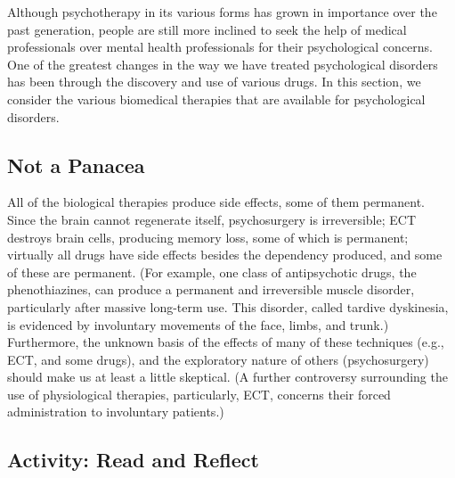 \documentclass[
]{book}
\begin{document}
Although psychotherapy in its various forms has grown in importance over the past generation, people are still more inclined to seek the help of medical professionals over mental health professionals for their psychological concerns. One of the greatest changes in the way we have treated psychological disorders has been through the discovery and use of various drugs. In this section, we consider the various biomedical therapies that are available for psychological disorders.

\hypertarget{not-a-panacea}{%
\subsection*{Not a Panacea}\label{not-a-panacea}}

All of the biological therapies produce side effects, some of them permanent. Since the brain cannot regenerate itself, psychosurgery is irreversible; ECT destroys brain cells, producing memory loss, some of which is permanent; virtually all drugs have side effects besides the dependency produced, and some of these are permanent. (For example, one class of antipsychotic drugs, the phenothiazines, can produce a permanent and irreversible muscle disorder, particularly after massive long-term use. This disorder, called tardive dyskinesia, is evidenced by involuntary movements of the face, limbs, and trunk.) Furthermore, the unknown basis of the effects of many of these techniques (e.g., ECT, and some drugs), and the exploratory nature of others (psychosurgery) should make us at least a little skeptical. (A further controversy surrounding the use of physiological therapies, particularly, ECT, concerns their forced administration to involuntary patients.)

\hypertarget{activity-read-and-reflect-22}{%
\subsection*{Activity: Read and Reflect}\label{activity-read-and-reflect-22}}
\end{document}
